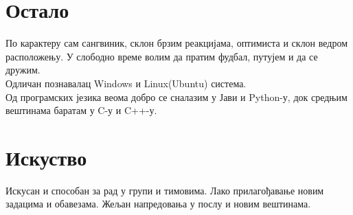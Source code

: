 \documentclass[letterpaper]{twentysecondcv}
\begin{document}

\section{Остало}

\large По карактеру сам сангвиник, склон брзим реакцијама, оптимиста и склон ведром расположењу. У слободно време волим да пратим фудбал, путујем и да се дружим. 
\\Одличан познавалац Windows и Linux(Ubuntu) система.
\\Од програмских језика веома добро се сналазим у Јави и Python-у, док средњим вештинама баратам у C-у и C++-у.


\section{Искуство}

\large Искусан и способан за рад у групи и тимовима. Лако прилагођавање новим задацима и обавезама. Жељан напредовања у послу и новим вештинама.
\end{document}
